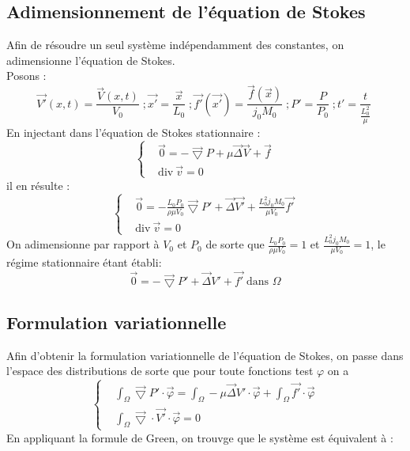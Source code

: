 \documentclass[a4paper,12pt,titlepage]{report}
\begin{document}
\begin{onehalfspace}

\subsection{Adimensionnement de l'équation de Stokes}

\normalsize Afin de résoudre un seul système indépendamment des constantes, on adimensionne l'équation de Stokes.
\\%
Posons :
\begin{equation*}
\vec{V'}(x,t)=\frac{\vec{V}(x,t)}{V_0}\;;\vec{x'}=\frac{\vec{x}}{L_0}\; ; \vec{f'}(\vec{x'})=\frac{\vec{f}(\vec{x})}{j_0M_0}\;;P'=\frac{P}{P_0}\; ;t'=\frac{t}{\frac{L_0^2}{\mu}}\;
\end{equation*}
En injectant dans l'équation de Stokes stationnaire :
\begin{equation*}
  \left\{
    \begin{aligned}
    &\vec{0} = -\vec{\bigtriangledown} P + \mu \vec{\Delta}\vec{V}+\vec{f} \\
    &\text{div} \ \vec{v} = 0
  \end{aligned}
  \right.
\end{equation*}
il en résulte :
\begin{equation*}
  \left\{
    \begin{aligned}
    &\vec{0}=-\frac{L_0 P_0}{\rho \mu V_0}\vec{\bigtriangledown} P '+  \vec{\Delta}\vec{V'}+\frac{L_0^2j_0M_0}{\mu V_0}\vec{f'} \\
    &\text{div} \ \vec{v} = 0
        \end{aligned}
  \right.
\end{equation*}
On adimensionne par rapport à $V_0$ et $P_0$ de sorte que $\frac{L_0 P_0}{\rho \mu V_0}=1$ et $ \frac{L_0^2j _0M_0}{\mu V_0}=1$, le régime stationnaire étant établi:
\[
      \vec{0}=-\vec{\bigtriangledown}P' +\vec{\Delta}V' +\vec{f'}\;\text{dans }\Omega 
\]

\subsection{Formulation variationnelle}

Afin d'obtenir la formulation variationnelle de l'équation de Stokes, on passe dans l'espace des distributions de sorte que pour toute fonctions test $\varphi$ on a 
\begin{equation*}
\left\{
\begin{aligned}
	&\int_\Omega\vec{\bigtriangledown}P'\cdot \vec \varphi=\int_\Omega-\mu\vec{\Delta}V'\cdot \vec \varphi +\int_\Omega\vec{f'}\cdot \vec \varphi \\
	&\int_\Omega\vec{\bigtriangledown}\cdot \vec{V'} \cdot \vec \varphi= 0
\end{aligned}
\right.
\end{equation*}
En appliquant la formule de Green, on trouvge que le système est équivalent à :


\end{onehalfspace}
\end{document}

